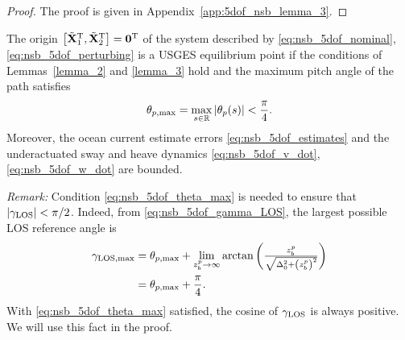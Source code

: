 \begin{proof}
    The proof is given in Appendix~\ref{app:5dof_nsb_lemma_3}.
\end{proof}

\begin{theorem}
    The origin $\left[\tilde{\mathbf{X}}_1^{\mathrm{T}}, \tilde{\mathbf{X}}_2^{\mathrm{T}}\right] = \mathbf{0}^{\mathrm{T}}$ of the system described by \eqref{eq:nsb_5dof_nominal},\eqref{eq:nsb_5dof_perturbing} is a USGES equilibrium point if the conditions of Lemmas~\ref{lemma_2} and \ref{lemma_3} hold and the maximum pitch angle of the path satisfies
    \begin{equation}
        \theta_{p, {\rm max}} = \max_{s \in \mathbb{R}} \left|\theta_p(s)\right| < \frac{\pi}{4}.
        \label{eq:nsb_5dof_theta_max}
    \end{equation}
    Moreover, the ocean current estimate errors \eqref{eq:nsb_5dof_estimates} and the underactuated sway and heave dynamics \eqref{eq:nsb_5dof_v_dot}, \eqref{eq:nsb_5dof_w_dot} are bounded.
\end{theorem}

\emph{Remark:} Condition \eqref{eq:nsb_5dof_theta_max} is needed to ensure that $\left|\gamma_{\rm LOS}\right| < \pi/2$.
Indeed, from \eqref{eq:nsb_5dof_gamma_LOS}, the largest possible LOS reference angle is
\begin{equation}
    \begin{split}
        \gamma_{\rm LOS, max} &= \theta_{p, {\rm max}} + \lim_{z_b^p \rightarrow \infty} \arctan\left(\scale[1]{\frac{z_b^p}{\sqrt{\Delta_0^2 + \left(z_b^p\right)^2}}}\right) \\
        &= \theta_{p, {\rm max}} + \frac{\pi}{4}.
    \end{split}
\end{equation}
With \eqref{eq:nsb_5dof_theta_max} satisfied, the cosine of $\gamma_{\rm LOS}$ is always positive. We will use this fact in the proof.

